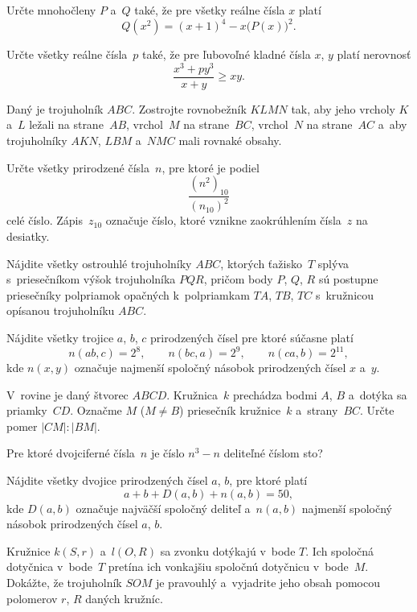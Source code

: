 {%
Určte mnohočleny $P$ a~$Q$ také, že pre všetky reálne čísla
$x$ platí
$$
Q(x^2)=(x+1)^4 - x\bigl(P(x)\bigr)^2.
$$}

{%
Určte všetky reálne čísla~$p$ také, že pre ľubovoľné kladné
čísla $x$, $y$ platí nerovnosť
$$
\frac{x^3+py^3}{x+y}\geq xy.
$$}

{%
Daný je trojuholník $ABC$. Zostrojte rovnobežník $KLMN$ tak, aby
jeho vrcholy $K$ a~$L$ ležali na strane~$AB$, vrchol~$M$ na
strane~$BC$, vrchol~$N$ na strane~$AC$ a~aby trojuholníky
$AKN$, $LBM$ a~$NMC$ mali rovnaké obsahy.}

{%
Určte všetky prirodzené čísla~$n$, pre ktoré je podiel
$$
\frac{(n^2)_{10}}{(n_{10})^2}
$$
celé číslo. Zápis~$z_{10}$ označuje číslo, ktoré vznikne
zaokrúhlením čísla~$z$ na desiatky.}

{%
Nájdite všetky ostrouhlé trojuholníky $ABC$, ktorých ťažisko~$T$
splýva s~priesečníkom výšok trojuholníka $PQR$, pričom body $P$,
$Q$, $R$ sú postupne priesečníky polpriamok opačných k~polpriamkam
$TA$, $TB$, $TC$ s~kružnicou opísanou trojuholníku $ABC$.}

{%
Nájdite všetky trojice $a$, $b$, $c$ prirodzených čísel pre
ktoré súčasne platí
$$
n(ab,c)=2^8,\qquad n(bc,a)=2^9,\qquad n(ca,b)=2^{11},
$$
kde $n(x,y)$ označuje najmenší spoločný násobok prirodzených
čísel $x$ a~$y$.}

{%
V~rovine je daný štvorec $ABCD$. Kružnica~$k$ prechádza bodmi $A$,
$B$ a~dotýka sa priamky~$CD$. Označme $M$ ($M\ne B$) priesečník
kružnice~$k$ a~strany~$BC$. Určte pomer $|CM|:|BM|$.}

{%
Pre ktoré dvojciferné čísla~$n$ je číslo $n^{3}-n$ deliteľné číslom
sto?}

{%
Nájdite všetky dvojice prirodzených čísel $a$, $b$, pre ktoré
platí
$$
   a + b + D(a,b) + n(a,b) = 50,
$$
kde $D(a,b)$ označuje najväčší spoločný
deliteľ a~$n(a,b)$ najmenší spoločný násobok
prirodzených čísel $a$, $b$.}

{%
Kružnice $k(S,r)$ a~$l(O,R)$ sa zvonku dotýkajú v~bode $T$. Ich
spoločná dotyčnica v~bode~$T$ pretína ich vonkajšiu spoločnú dotyčnicu
v~bode~$M$. Dokážte, že trojuholník $SOM$ je pravouhlý a~vyjadrite jeho
obsah pomocou polomerov $r$, $R$ daných kružníc.}

